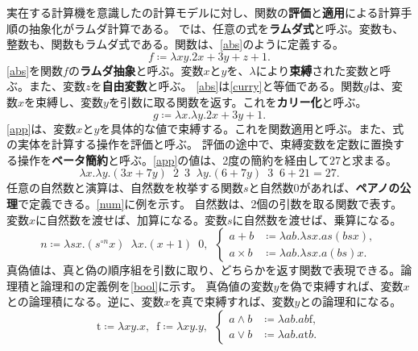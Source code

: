 \documentclass[10pt,a4paper]{book}
\DeclareMathOperator*{\app}{\enspace\xrightarrow[\beta]{}\enspace}
\begin{document}
実在する計算機を意識したの計算モデルに対し、関数の\textbf{評価}と\textbf{適用}による計算手順の抽象化がラムダ計算である。
では、任意の式を\textbf{ラムダ式}と呼ぶ。変数も、整数も、関数もラムダ式である。関数は、\eqref{abs}のように定義する。
%
\begin{equation}
\label{eq:abs}
f \coloneqq \lambda xy.2x+3y+z+1.
\end{equation}
%
\eqref{abs}を関数$f$の\textbf{ラムダ抽象}と呼ぶ。変数$x$と$y$を、$\lambda$により\textbf{束縛}された変数と呼ぶ。また、変数$z$を\textbf{自由変数}と呼ぶ。
\eqref{abs}は\eqref{curry}と等価である。関数$g$は、変数$x$を束縛し、変数$y$を引数に取る関数を返す。これを\textbf{カリー化}と呼ぶ。
%
\begin{equation}
\label{eq:curry}
g \coloneqq \lambda x.\lambda y.2x+3y+1.
\end{equation}
%
\eqref{app}は、変数$x$と$y$を具体的な値で束縛する。これを関数適用と呼ぶ。また、式の実体を計算する操作を評価と呼ぶ。
評価の途中で、束縛変数を定数に置換する操作を\textbf{ベータ簡約}と呼ぶ。\eqref{app}の値は、2度の簡約を経由して$27$と求まる。
%
\begin{equation}
\label{eq:app}
\lambda x.\lambda y.(3x+7y) \enspace 2 \enspace 3 \app \lambda y.(6+7y) \enspace 3 \app 6+21 = 27.
\end{equation}
%
任意の自然数と演算は、自然数を枚挙する関数$s$と自然数$0$があれば、\textbf{ペアノの公理}で定義できる。\eqref{num}に例を示す。
自然数は、2個の引数を取る関数で表す。変数$x$に自然数を渡せば、加算になる。変数$s$に自然数を渡せば、乗算になる。
%
\begin{equation}
\label{eq:num}
n \coloneqq \lambda sx.(s^{\circ n}x) \enspace \lambda x.(x+1) \enspace 0,
\enspace
\left\{
\begin{aligned}
a + b &\coloneqq \lambda ab.\lambda sx.as(bsx),\\
a \times b &\coloneqq \lambda ab.\lambda sx.a(bs)x.
\end{aligned}
\right.
\end{equation}
%
真偽値は、真と偽の順序組を引数に取り、どちらかを返す関数で表現できる。論理積と論理和の定義例を\eqref{bool}に示す。
真偽値の変数$y$を偽で束縛すれば、変数$x$との論理積になる。逆に、変数$x$を真で束縛すれば、変数$y$との論理和になる。
%
\begin{equation}
\label{eq:bool}
\mathrm{t} \coloneqq \lambda xy.x, \enspace
\mathrm{f} \coloneqq \lambda xy.y, \enspace
\left\{
\begin{aligned}
a \land b &\coloneqq \lambda ab.ab\mathrm{f},\\
a \lor  b &\coloneqq \lambda ab.a\mathrm{t}b.
\end{aligned}
\right.
\end{equation}
\end{document}
